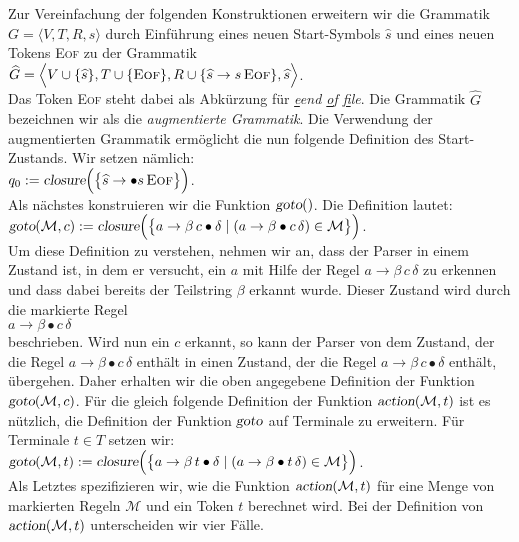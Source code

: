 Zur Vereinfachung der folgenden Konstruktionen erweitern wir die
Grammatik $G = \langle V, T, R, s \rangle$ durch Einf\"uhrung eines neuen Start-Symbols $\widehat{s}$
und eines neuen Tokens \textsc{Eof} zu der Grammatik 
\\[0.2cm]
\hspace*{1.3cm}
$\widehat{G} = 
 \Bigl\langle V \cup \{ \widehat{s} \}, T \cup \{\textsc{Eof}\}, R \cup \{ \widehat{s} \rightarrow s\, \textsc{Eof} \}, \widehat{s} \Bigr\rangle
$.
\\[0.2cm]
Das Token \textsc{Eof} steht dabei als Abk\"urzung f\"ur \emph{\underline{e}end \underline{o}f \underline{f}ile}.
Die Grammatik $\widehat{G}$ bezeichnen wir als die \emph{augmentierte Grammatik}.  Die Verwendung der
augmentierten Grammatik erm\"oglicht die nun folgende Definition des Start-Zustands.
Wir setzen n\"amlich:
\\[0.2cm]
\hspace*{1.3cm}
$ q_0 := \textsl{closure}\Bigl( \bigl\{ \widehat{s} \rightarrow \bullet s\,\textsc{Eof} \bigr\} \Bigr)$.
\\[0.2cm]
Als n\"achstes konstruieren wir die Funktion $\textsl{goto}()$.  Die Definition lautet:
\\[0.2cm]
\hspace*{1.3cm}
$\textsl{goto}(\mathcal{M}, c) := \textsl{closure}\Bigl( \bigl\{ 
   a \rightarrow \beta\, c \bullet \delta \mid (a \rightarrow \beta \bullet c\, \delta) \in \mathcal{M} 
   \bigr\} \Bigr)
$.
\\[0.2cm]
Um diese Definition zu verstehen, nehmen wir an, dass der Parser in einem Zustand ist, in dem er
versucht, ein $a$ mit Hilfe der Regel $a \rightarrow \beta\, c\, \delta$ zu erkennen und dass dabei bereits
der Teilstring $\beta$ erkannt wurde.  Dieser Zustand wird durch die markierte Regel
\\[0.2cm]
\hspace*{1.3cm}
$a \rightarrow \beta \bullet c\, \delta$ 
\\[0.2cm] 
beschrieben.  Wird nun ein $c$ erkannt, so kann der Parser von dem Zustand, der die 
Regel $a \rightarrow \beta \bullet c\, \delta$ enth\"alt in einen Zustand, der die Regel 
$a \rightarrow \beta\, c \bullet \delta$ 
enth\"alt, \"ubergehen.  Daher erhalten wir die oben angegebene Definition der Funktion $\textsl{goto}(\mathcal{M},c)$.
F\"ur die gleich folgende Definition der Funktion $\textsl{action}(\mathcal{M}, t)$ ist es
n\"utzlich, die Definition der Funktion $\textsl{goto}$ auf Terminale zu erweitern.  
F\"ur Terminale $t \in T$ setzen wir:
\\[0.2cm]
\hspace*{1.3cm}
$\textsl{goto}(\mathcal{M}, t) := \textsl{closure}\Bigl( \bigl\{ 
   a \rightarrow \beta\, t \bullet \delta \mid (a \rightarrow \beta \bullet t\, \delta) \in \mathcal{M} 
   \bigr\} \Bigr)
$.
\\[0.2cm]
Als Letztes spezifizieren wir, wie die Funktion $\textsl{action}(\mathcal{M},t)$ f\"ur eine Menge von
markierten Regeln $\mathcal{M}$ und ein Token $t$ berechnet wird.  
Bei der Definition von $\textsl{action}(\mathcal{M},t)$ unterscheiden wir vier F\"alle.
\pagebreak

